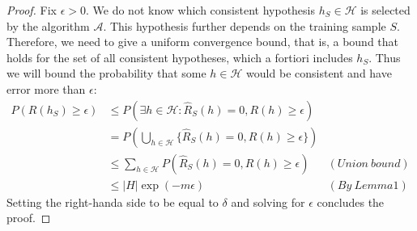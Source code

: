 \begin{proof}
	Fix $\epsilon > 0$. We do not know which consistent hypothesis $h_S \in \mathcal{H}$ is selected by the algorithm $\mathcal{A}$. This hypothesis further depends on the training sample $S$. Therefore, we need to give a uniform convergence bound, that is, a bound that holds for the set of all consistent hypotheses, which a fortiori includes $h_S$. Thus we will bound the probability that some $h \in \mathcal{H}$ would be consistent and have error more than $\epsilon$:
	\begin{align}
	P\left( R(h_S) \geq \epsilon \right) &\leq
	P\left( \exists h \in \mathcal{H}: \hat{R}_S (h)=0, R(h) \geq \epsilon \right) \\
	&= P\left(\bigcup_{h \in \mathcal{H}} \{ \hat{R}_S (h)=0, R(h) \geq \epsilon \} \right) \\
	&\leq \sum_{h \in \mathcal{H}} P\left( \hat{R}_S (h)=0, R(h) \geq \epsilon \right) 
	&(Union\ bound)\\
	&\leq |H|\exp(-m\epsilon)      	
	&(By\ Lemma1)	
	\end{align}
	Setting the right-handa side to be equal to $\delta$ and solving for $\epsilon$ concludes the proof.
\end{proof}
